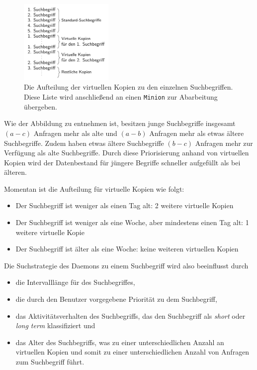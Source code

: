 \begin{figure}
\centering
\includegraphics[width=0.4\textwidth]{Bilder/Daemon/VirtualCopies.pdf}
\caption{Die Aufteilung der virtuellen Kopien zu den einzelnen Suchbegriffen. Diese Liste wird anschließend an einen \texttt{Minion} zur Abarbeitung übergeben. \label{figure:daemon_virt_copies}}
\end{figure}

Wie der Abbildung zu entnehmen ist, besitzen junge Suchbegriffe insgesamt $(a - c)$ Anfragen mehr als alte und $(a - b)$ Anfragen mehr als etwas ältere Suchbegriffe.
Zudem haben etwas ältere Suchbegriffe $(b - c)$ Anfragen mehr zur Verfügung als alte Suchbegriffe. Durch diese Priorisierung anhand von virtuellen Kopien wird der Datenbestand für jüngere Begriffe schneller aufgefüllt als bei älteren. 

Momentan ist die Aufteilung für virtuelle Kopien wie folgt:
\begin{itemize}
\item Der Suchbegriff ist weniger als einen Tag alt: 2 weitere virtuelle Kopien
\item Der Suchbegriff ist weniger als eine Woche, aber mindestens einen Tag alt: 1 weitere virtuelle Kopie
\item Der Suchbegriff ist älter als eine Woche: keine weiteren virtuellen Kopien
\end{itemize}

Die Suchstrategie des Daemons zu einem Suchbegriff wird also beeinflusst durch
\begin{itemize}
\item die Intervalllänge für des Suchbegriffes,
\item die durch den Benutzer vorgegebene Priorität zu dem Suchbegriff,
\item das Aktivitätsverhalten des Suchbegriffs, das den Suchbegriff als \textit{short} oder \textit{long term} klassifiziert und
\item das Alter des Suchbegriffs, was zu einer unterschiedlichen Anzahl an virtuellen Kopien und somit zu einer unterschiedlichen Anzahl von Anfragen zum Suchbegriff führt. 
\end{itemize}

